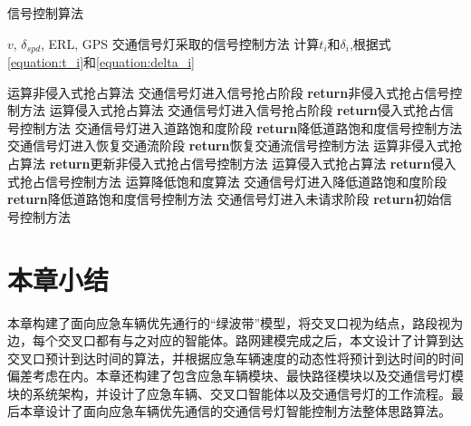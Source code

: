 \begin{breakablealgorithm}
	\small
	\caption{信号控制算法} 
	\label{alg}
	\begin{algorithmic}[1]
		\REQUIRE ${v}$, ${\delta_{spd}}$, ERL, GPS
		\ENSURE 交通信号灯采取的信号控制方法
			\STATE 计算${t_i}$和${\delta_i}$,根据式\ref{equation:t_i}和\ref{equation:delta_i}
		
				\STATE 运算非侵入式抢占算法
					\STATE 交通信号灯进入信号抢占阶段
					\STATE \textbf{return}非侵入式抢占信号控制方法
				\ELSE
					\STATE 运算侵入式抢占算法
						\STATE 交通信号灯进入信号抢占阶段
						\STATE \textbf{return}侵入式抢占信号控制方法
					\ELSE 
							\STATE 交通信号灯进入道路饱和度阶段
						\ENDIF
						\STATE \textbf{return}降低道路饱和度信号控制方法
					\ENDIF
				\ENDIF
					\STATE 交通信号灯进入恢复交通流阶段
					\STATE \textbf{return}恢复交通流信号控制方法
				\ELSE
							\STATE 运算非侵入式抢占算法
									\STATE \textbf{return}更新非侵入式抢占信号控制方法
								\ELSE 
									\STATE 运算侵入式抢占算法
										\STATE \textbf{return}侵入式抢占信号控制方法
									\ELSE
										\STATE 运算降低饱和度算法
										\STATE 交通信号灯进入降低道路饱和度阶段
										\STATE \textbf{return}降低道路饱和度信号控制方法
									\ENDIF
								\ENDIF
						\ENDIF
					\ENDIF
				\ENDIF
			\ELSE
					\STATE 交通信号灯进入未请求阶段
					\STATE \textbf{return}初始信号控制方法
				\ENDIF
			\ENDIF
		\ENDWHILE
	\end{algorithmic}
\end{breakablealgorithm}

\section{本章小结}
本章构建了面向应急车辆优先通行的“绿波带”模型，将交叉口视为结点，路段视为边，每个交叉口都有与之对应的智能体。路网建模完成之后，本文设计了计算到达交叉口预计到达时间的算法，并根据应急车辆速度的动态性将预计到达时间的时间偏差考虑在内。本章还构建了包含应急车辆模块、最快路径模块以及交通信号灯模块的系统架构，并设计了应急车辆、交叉口智能体以及交通信号灯的工作流程。最后本章设计了面向应急车辆优先通信的交通信号灯智能控制方法整体思路算法。
